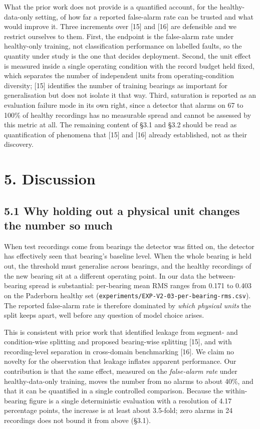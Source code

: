 \documentclass[11pt]{article}
\newcommand{\code}[1]{\texttt{#1}}
\begin{document}
What the prior work does not provide is a quantified account, for the healthy-data-only setting, of how far a reported false-alarm rate can be trusted and what would improve it. Three increments over [15] and [16] are defensible and we restrict ourselves to them. First, the endpoint is the false-alarm rate under healthy-only training, not classification performance on labelled faults, so the quantity under study is the one that decides deployment. Second, the unit effect is measured inside a single operating condition with the record budget held fixed, which separates the number of independent units from operating-condition diversity; [15] identifies the number of training bearings as important for generalisation but does not isolate it that way. Third, saturation is reported as an evaluation failure mode in its own right, since a detector that alarms on 67 to 100\% of healthy recordings has no measurable spread and cannot be assessed by this metric at all. The remaining content of \S3.1 and \S3.2 should be read as quantification of phenomena that [15] and [16] already established, not as their discovery.



\section{5. Discussion}

\subsection{5.1 Why holding out a physical unit changes the number so much}

When test recordings come from bearings the detector was fitted on, the detector has effectively seen that bearing's baseline level. When the whole bearing is held out, the threshold must generalise across bearings, and the healthy recordings of the new bearing sit at a different operating point. In our data the between-bearing spread is substantial: per-bearing mean RMS ranges from 0.171 to 0.403 on the Paderborn healthy set (\code{experiments/EXP-V2-03-per-bearing-rms.csv}). The reported false-alarm rate is therefore dominated by \emph{which physical units} the split keeps apart, well before any question of model choice arises.

This is consistent with prior work that identified leakage from segment- and condition-wise splitting and proposed bearing-wise splitting [15], and with recording-level separation in cross-domain benchmarking [16]. We claim no novelty for the observation that leakage inflates apparent performance. Our contribution is that the same effect, measured on the \emph{false-alarm rate} under healthy-data-only training, moves the number from no alarms to about 40\%, and that it can be quantified in a single controlled comparison. Because the within-bearing figure is a single deterministic evaluation with a resolution of 4.17 percentage points, the increase is at least about 3.5-fold; zero alarms in 24 recordings does not bound it from above (\S3.1).
\end{document}
